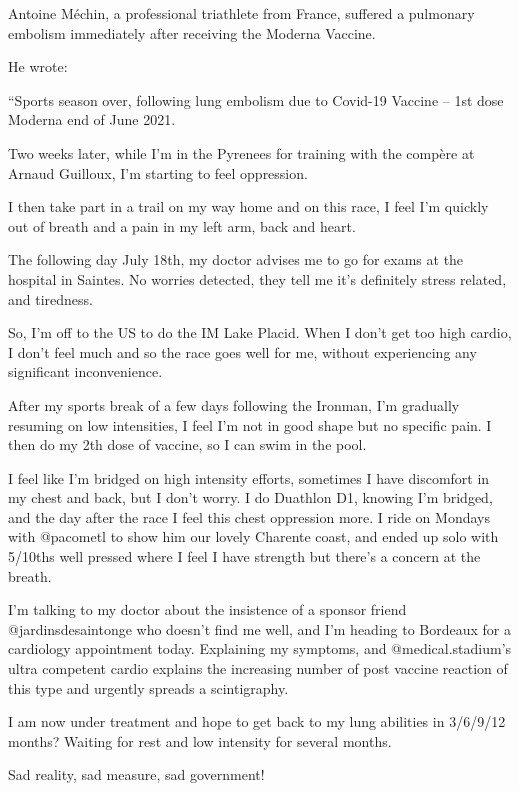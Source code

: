 Antoine Méchin, a professional triathlete from France, suffered a pulmonary
embolism immediately after receiving the Moderna Vaccine.

He wrote:

“Sports season over, following lung embolism due to Covid-19 Vaccine – 1st dose
Moderna end of June 2021.

Two weeks later, while I’m in the Pyrenees for training with the compère at
Arnaud Guilloux, I’m starting to feel oppression.

I then take part in a trail on my way home and on this race, I feel I’m quickly
out of breath and a pain in my left arm, back and heart.

The following day July 18th, my doctor advises me to go for exams at the
hospital in Saintes. No worries detected, they tell me it’s definitely stress
related, and tiredness.

So, I’m off to the US to do the IM Lake Placid. When I don’t get too high
cardio, I don’t feel much and so the race goes well for me, without experiencing
any significant inconvenience.

After my sports break of a few days following the Ironman, I’m gradually
resuming on low intensities, I feel I’m not in good shape but no specific
pain. I then do my 2th dose of vaccine, so I can swim in the pool.

I feel like I’m bridged on high intensity efforts, sometimes I have discomfort
in my chest and back, but I don’t worry. I do Duathlon D1, knowing I’m bridged,
and the day after the race I feel this chest oppression more. I ride on Mondays
with @pacometl to show him our lovely Charente coast, and ended up solo with
5/10ths well pressed where I feel I have strength but there’s a concern at the
breath.

I’m talking to my doctor about the insistence of a sponsor friend
@jardinsdesaintonge who doesn’t find me well, and I’m heading to Bordeaux for a
cardiology appointment today. Explaining my symptoms, and @medical.stadium’s
ultra competent cardio explains the increasing number of post vaccine reaction
of this type and urgently spreads a scintigraphy.

I am now under treatment and hope to get back to my lung abilities in 3/6/9/12
months? Waiting for rest and low intensity for several months.

Sad reality, sad measure, sad government!

